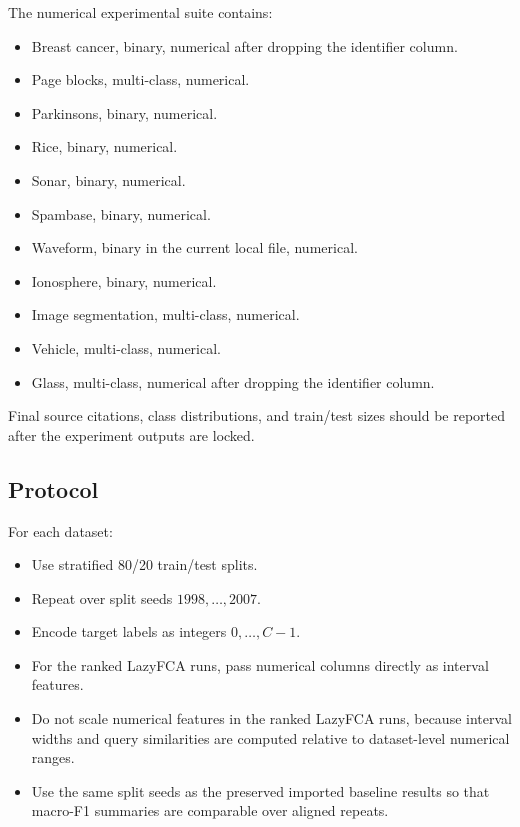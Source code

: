 \documentclass[11pt]{article}
\begin{document}
The numerical experimental suite contains:

\begin{itemize}[leftmargin=*]
    \item Breast cancer, binary, numerical after dropping the identifier column.
    \item Page blocks, multi-class, numerical.
    \item Parkinsons, binary, numerical.
    \item Rice, binary, numerical.
    \item Sonar, binary, numerical.
    \item Spambase, binary, numerical.
    \item Waveform, binary in the current local file, numerical.
    \item Ionosphere, binary, numerical.
    \item Image segmentation, multi-class, numerical.
    \item Vehicle, multi-class, numerical.
    \item Glass, multi-class, numerical after dropping the identifier column.
\end{itemize}

Final source citations, class distributions, and train/test sizes should be
reported after the experiment outputs are locked.

\subsection{Protocol}

For each dataset:

\begin{itemize}[leftmargin=*]
    \item Use stratified 80/20 train/test splits.
    \item Repeat over split seeds $1998,\ldots,2007$.
    \item Encode target labels as integers $0,\ldots,C-1$.
    \item For the ranked LazyFCA runs, pass numerical columns directly as
    interval features.
    \item Do not scale numerical features in the ranked LazyFCA runs, because
    interval widths and query similarities are computed relative to
    dataset-level numerical ranges.
    \item Use the same split seeds as the preserved imported baseline results
    so that macro-F1 summaries are comparable over aligned repeats.
\end{itemize}
\end{document}
